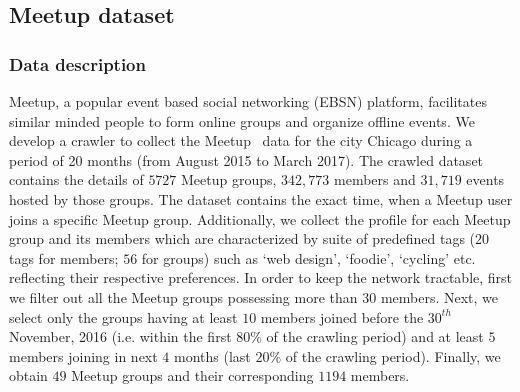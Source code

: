 \subsection{Meetup dataset}

\subsubsection{Data description}
Meetup, a popular event based social networking (EBSN) platform, facilitates similar minded people to form online groups and
organize offline events.
We develop a crawler to collect the Meetup~\cite{pramanik2016predicting}
data for the city Chicago
during a period of 20 months (from August 2015 to March 2017).
The crawled dataset contains the details of $5727$ Meetup groups, $342,773$ members and $31,719$ events hosted
by those groups. The dataset contains the exact time, when a Meetup user joins a specific Meetup group.
Additionally, we collect the profile for each Meetup group and its members which are characterized by suite of predefined tags 
($20$ tags for members; $56$ for groups)
such as `web design', `foodie', `cycling' etc. reflecting
their respective preferences. In order to keep the network tractable, first we filter out all the Meetup groups possessing more than
$30$ members. Next, we select only the groups having at least $10$ members joined before the ${30}^{th}$ 
November, 2016 (i.e. within the first $80\%$ of the crawling period) and
at least $5$ members joining in next $4$ months (last $20\%$ of the crawling period). Finally, we obtain $49$ Meetup groups and their 
corresponding $1194$ members.

